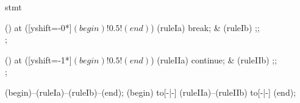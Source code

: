 \begin{syntax}{stmt}
  
  \node[sequence] () at ([yshift=-0*\syntaxruledist]$(begin)!0.5!(end)$) {
    \node[terminal] (ruleIa) {break};
    &
    \node[terminal] (ruleIb) {;};
    \\
  };
  
  \node[sequence] () at ([yshift=-1*\syntaxruledist]$(begin)!0.5!(end)$) {
    \node[terminal]    (ruleIIa) {continue};
    &
    \node[terminal] (ruleIIb) {;};
    \\
  };
  
  \draw[path] (begin)--(ruleIa)--(ruleIb)--(end);
  \draw[path] (begin) to[-|-] (ruleIIa)--(ruleIIb) to[-|-] (end);
\end{syntax}

